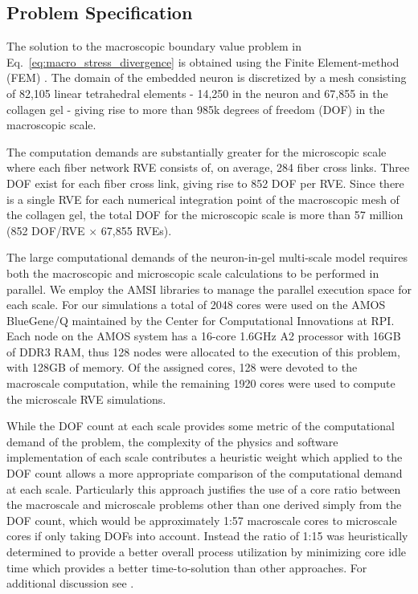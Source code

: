 \documentclass[]{interact}
\begin{document}
\subsection{Problem Specification}\label{sec:specification}
The solution to the macroscopic boundary value problem in Eq.\ \eqref{eq:macro_stress_divergence} is obtained using the Finite Element-method (FEM) \citep{JavierBonet:2008uxa}. The domain of the embedded neuron is discretized by a mesh consisting of  82,105 linear tetrahedral elements - 14,250 in the neuron and 67,855 in the collagen gel - giving rise to more than 985k degrees of freedom (DOF) in the macroscopic scale.

The computation demands are substantially greater for the microscopic scale where each fiber network RVE consists of, on average, 284 fiber cross links. Three DOF exist for each fiber cross link, giving rise to 852 DOF per RVE. Since there is a single RVE for each numerical integration point of the macroscopic mesh of the collagen gel, the total DOF for the microscopic scale is more than 57 million (852 DOF/RVE $\times$ 67,855 RVEs). 

The large computational demands of the neuron-in-gel multi-scale model requires both the macroscopic and microscopic scale calculations to be performed in parallel. We employ the AMSI libraries to manage the parallel execution space for each scale. For our simulations a total of 2048 cores were used on the AMOS BlueGene/Q maintained by the Center for Computational Innovations at RPI. Each node on the AMOS system has a 16-core 1.6GHz A2 processor with 16GB of DDR3 RAM, thus 128 nodes were allocated to the execution of this problem, with 128GB of memory. Of the assigned cores, 128 were devoted to the macroscale computation, while the remaining 1920 cores were used to compute the microscale RVE simulations. 

While the DOF count at each scale provides some metric of the computational demand of the problem, the complexity of the physics and software implementation of each scale contributes a heuristic weight which applied to the DOF count allows a more appropriate comparison of the computational demand at each scale. Particularly this approach justifies the use of a core ratio between the macroscale and microscale problems other than one derived simply from the DOF count, which would be approximately 1:57 macroscale cores to microscale cores if only taking DOFs into account. Instead the ratio of 1:15 was heuristically determined to provide a better overall process utilization by minimizing core idle time which provides a better time-to-solution than other approaches. For additional discussion see \cite{Tobin:2017ip}.
\end{document}
